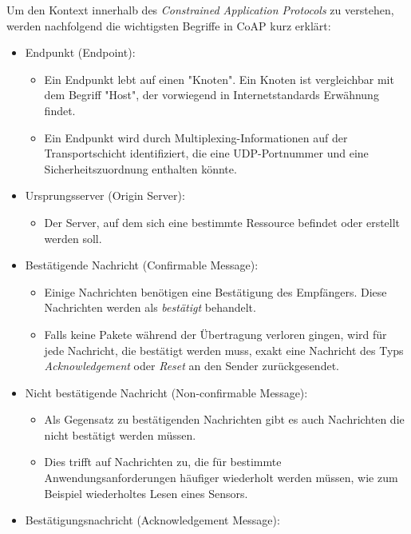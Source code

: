 Um den Kontext innerhalb des \textit{Constrained Application Protocols} zu verstehen, werden nachfolgend die wichtigsten Begriffe in CoAP kurz erklärt:
\begin{itemize}
    \item Endpunkt (Endpoint):
          \begin{itemize}
              \item Ein Endpunkt lebt auf einen "Knoten". Ein Knoten ist vergleichbar mit dem Begriff "Host", der vorwiegend in Internetstandards Erwähnung findet.
              \item Ein Endpunkt wird durch Multiplexing-Informationen auf der Transportschicht identifiziert, die eine UDP-Portnummer und eine Sicherheitszuordnung enthalten könnte.
          \end{itemize}
    \item Ursprungsserver (Origin Server):
          \begin{itemize}
              \item Der Server, auf dem sich eine bestimmte Ressource befindet oder erstellt werden soll.
          \end{itemize}
    \item Bestätigende Nachricht (Confirmable Message):
          \begin{itemize}
              \item Einige Nachrichten benötigen eine Bestätigung des Empfängers. Diese Nachrichten werden als \textit{bestätigt} behandelt.
              \item Falls keine Pakete während der Übertragung verloren gingen, wird für jede Nachricht, die bestätigt werden muss, exakt eine Nachricht des Typs \textit{Acknowledgement} oder \textit{Reset} an den Sender zurückgesendet.
          \end{itemize}
    \item Nicht bestätigende Nachricht (Non-confirmable Message):
          \begin{itemize}
              \item Als Gegensatz zu bestätigenden Nachrichten gibt es auch Nachrichten die nicht bestätigt werden müssen.
              \item Dies trifft auf Nachrichten zu, die für bestimmte Anwendungsanforderungen häufiger wiederholt werden müssen, wie zum Beispiel wiederholtes Lesen eines Sensors.
          \end{itemize}
    \item Bestätigungsnachricht (Acknowledgement Message):
          \begin{itemize}

\end{itemize}
\end{itemize}

